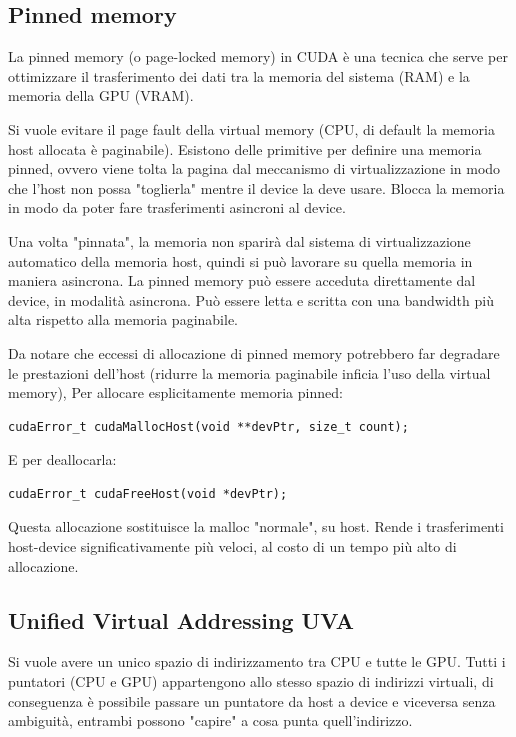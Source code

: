 \subsection{Pinned memory}
La pinned memory (o page-locked memory) in CUDA è una tecnica che serve per ottimizzare il trasferimento dei dati tra la memoria del sistema (RAM) e la memoria della GPU (VRAM). 

Si vuole evitare il page fault della virtual memory (CPU, di default la memoria host allocata è paginabile). Esistono delle primitive per definire una memoria pinned, ovvero viene tolta la pagina dal meccanismo di virtualizzazione in modo che l'host non possa "toglierla" mentre il device la deve usare. Blocca la memoria in modo da poter fare trasferimenti asincroni al device.

Una volta "pinnata", la memoria non sparirà dal sistema di virtualizzazione automatico della memoria host, quindi si può lavorare su quella memoria in maniera asincrona. La pinned memory può essere acceduta direttamente dal device, in modalità asincrona. Può essere letta e scritta con una bandwidth più alta rispetto alla memoria paginabile.

Da notare che eccessi di allocazione di pinned memory potrebbero far degradare le prestazioni dell'host (ridurre la memoria paginabile inficia l'uso della virtual memory), Per allocare esplicitamente memoria pinned:
\begin{verbatim}
cudaError_t cudaMallocHost(void **devPtr, size_t count);
\end{verbatim}

E per deallocarla:
\begin{verbatim}
cudaError_t cudaFreeHost(void *devPtr);
\end{verbatim}

Questa allocazione sostituisce la malloc "normale", su host. Rende i trasferimenti host-device significativamente più veloci, al costo di un tempo più alto di allocazione.

\subsection{Unified Virtual Addressing UVA}

Si vuole avere un unico spazio di indirizzamento tra CPU e tutte le GPU. Tutti i puntatori (CPU e GPU) appartengono allo stesso spazio di indirizzi virtuali, di conseguenza è possibile passare un puntatore da host a device e viceversa senza ambiguità, entrambi possono "capire" a cosa punta quell'indirizzo.

